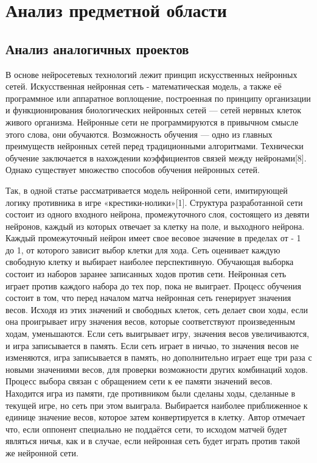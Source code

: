 \newpage
\section{Анализ предметной области}
\subsection{Анализ аналогичных проектов}
В основе нейросетевых технологий лежит принцип искусственных нейронных сетей. Искусственная нейронная сеть - математическая модель, а также её программное или аппаратное воплощение, построенная по принципу организации и функционирования биологических нейронных сетей — сетей нервных клеток живого организма. Нейронные сети не программируются в привычном смысле этого слова, они обучаются. Возможность обучения — одно из главных преимуществ нейронных сетей перед традиционными алгоритмами. Технически обучение заключается в нахождении коэффициентов связей между нейронами[8]. Однако существует множество способов обучения нейронных сетей. 

Так, в одной статье рассматривается модель нейронной сети, имитирующей логику противника в игре «крестики-нолики»[1]. Структура разработанной сети состоит из одного входного нейрона, промежуточного слоя, состоящего из девяти нейронов, каждый из которых отвечает за клетку на поле, и выходного нейрона. Каждый промежуточный нейрон имеет свое весовое значение в пределах от - 1 до 1, от которого зависит выбор клетки для хода. Сеть оценивает каждую свободную клетку и выбирает наиболее перспективную. Обучающая выборка состоит из наборов заранее записанных ходов против сети. Нейронная сеть играет против каждого набора до тех пор, пока не выиграет. Процесс обучения состоит в том, что перед началом матча нейронная сеть генерирует значения весов. Исходя из этих значений и свободных клеток, сеть делает свои ходы, если она проигрывает игру значения весов, которые соответствуют произведенным ходам, уменьшаются. Если сеть выигрывает игру, значения весов увеличиваются, и игра записывается в память. Если сеть играет в ничью, то значения весов не изменяются, игра записывается в память, но дополнительно играет еще три раза с новыми значениями весов, для проверки возможности других комбинаций ходов. Процесс выбора связан с обращением сети к ее памяти значений весов. Находится игра из памяти, где противником были сделаны ходы, сделанные в текущей игре, но сеть при этом выиграла. Выбирается наиболее приближенное к единице значение весов, которое затем конвертируется в клетку. Автор отмечает что, если оппонент специально не поддаётся сети, то исходом матчей будет являться ничья, как и в случае, если нейронная сеть будет играть против такой же нейронной сети.

